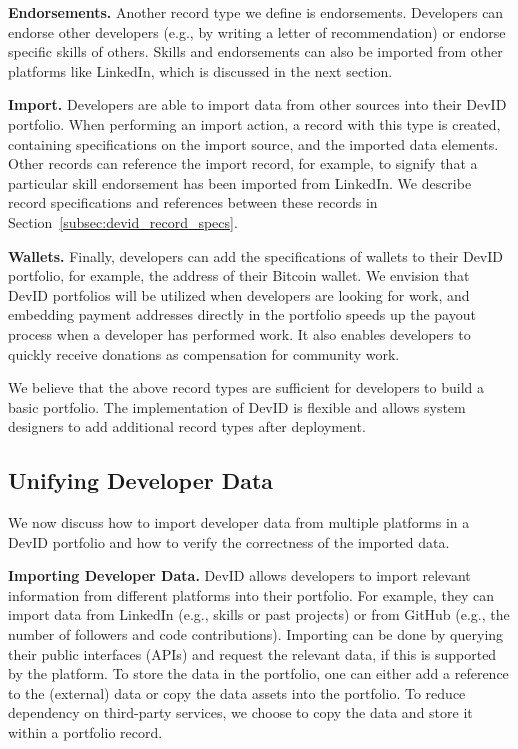 \textbf{Endorsements.}
Another record type we define is endorsements.
Developers can endorse other developers (e.g., by writing a letter of recommendation) or endorse specific skills of others.
Skills and endorsements can also be imported from other platforms like LinkedIn, which is discussed in the next section.

\textbf{Import.}
Developers are able to import data from other sources into their DevID portfolio.
When performing an import action, a record with this type is created, containing specifications on the import source, and the imported data elements.
Other records can reference the import record, for example, to signify that a particular skill endorsement has been imported from LinkedIn.
We describe record specifications and references between these records in Section~\ref{subsec:devid_record_specs}.

\textbf{Wallets.}
Finally, developers can add the specifications of wallets to their DevID portfolio, for example, the address of their Bitcoin wallet.
We envision that DevID portfolios will be utilized when developers are looking for work, and embedding payment addresses directly in the portfolio speeds up the payout process when a developer has performed work.
It also enables developers to quickly receive donations as compensation for community work.

We believe that the above record types are sufficient for developers to build a basic portfolio.
The implementation of DevID is flexible and allows system designers to add additional record types after deployment.

\subsection{Unifying Developer Data}
\label{subsec:unifying_data}
We now discuss how to import developer data from multiple platforms in a DevID portfolio and how to verify the correctness of the imported data.

\textbf{Importing Developer Data.}
DevID allows developers to import relevant information from different platforms into their portfolio.
For example, they can import data from LinkedIn (e.g., skills or past projects) or from GitHub (e.g., the number of followers and code contributions).
Importing can be done by querying their public interfaces (APIs) and request the relevant data, if this is supported by the platform.
To store the data in the portfolio, one can either add a reference to the (external) data or copy the data assets into the portfolio.
To reduce dependency on third-party services, we choose to copy the data and store it within a portfolio record.

